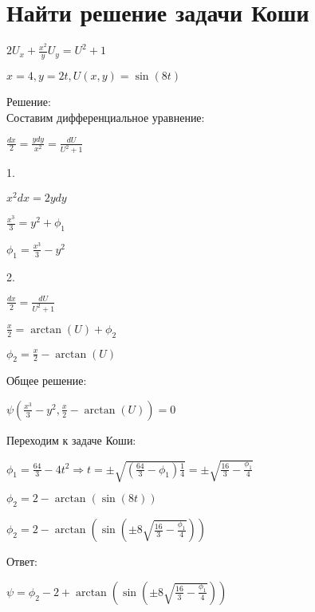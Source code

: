 \documentclass{article}
\begin{document}
	\section{Найти решение задачи Коши}
	\begin{center}
		$ 2 U_x + \frac{x^2}{y}U_y = U^2 + 1 $
	\end{center}
	\begin{center}
		$ x = 4, y = 2t, U(x, y) = \sin(8t) $
	\end{center}
	Решение: \\
	Составим дифференциальное уравнение: \\
	\begin{center}
		$ \frac{dx}{2}=\frac{ydy}{x^2} = \frac{dU}{U^2 + 1} $ \\
	\end{center}
	1. \\
	\begin{center}
		$ x^2dx = 2ydy $ \\
	\end{center}
	\begin{center}
		$ \frac{x^3}{3} = y^2 + \phi_1 $ \\
	\end{center}
	\begin{center}
		$ \phi_1 = \frac{x^3}{3} - y^2 $ \\
	\end{center}
	2. \\
	\begin{center}
		$ \frac{dx}{2} = \frac{dU}{U^2 + 1} $ \\
	\end{center}
	\begin{center}
		$ \frac{x}{2} = \arctan(U) + \phi_2 $ \\
	\end{center}
	\begin{center}
		$ \phi_2 = \frac{x}{2} - \arctan(U) $ \\
	\end{center}
	Общее решение: \\
	\begin{center}
		$ \psi(\frac{x^3}{3} - y^2, \frac{x}{2} - \arctan(U)) = 0 $ \\
	\end{center}
	Переходим к задаче Коши:
	\begin{center}
		$ \phi_1 = \frac{64}{3} - 4t^2 \Rightarrow t = \pm \sqrt{ (\frac{64}{3} - \phi_1) \frac{1}{4} } = \pm \sqrt{\frac{16}{3} - \frac{\phi_1}{4}} $ \\
	\end{center}
	\begin{center}
		$ \phi_2 = 2 - \arctan(\sin(8t)) $ \\
	\end{center}
	\begin{center}
		$ \phi_2 = 2 - \arctan(\sin(\pm 8\sqrt{\frac{16}{3} - \frac{\phi_1}{4}})) $ \\
	\end{center}
	Ответ:
	\begin{center}
		$ \psi = \phi_2 - 2 + \arctan(\sin(\pm 8\sqrt{\frac{16}{3} - \frac{\phi_1}{4}})) $ \\
	\end{center}
\end{document}
